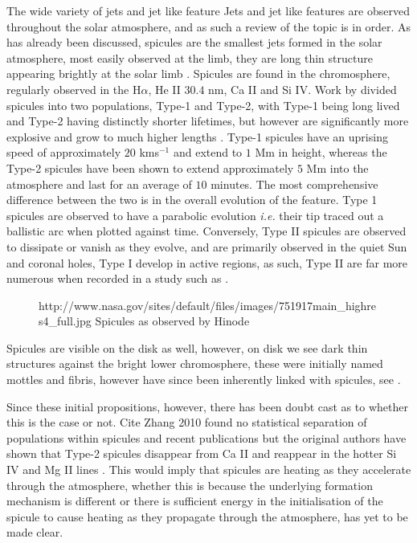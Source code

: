 The wide variety of jets and jet like feature 
Jets and jet like features are observed throughout the solar atmosphere, and as such a review of the topic is in order.
As has already been discussed, spicules are the smallest jets formed in the solar atmosphere, 
most easily observed at the limb, they are long thin structure appearing brightly at the solar limb \citep{Beckers1972}.
Spicules are found in the chromosphere, regularly observed in the H$\alpha$, He II $30.4$ nm, Ca II and Si IV.
Work by \cite{DePontieu} divided spicules into two populations, Type-1 and Type-2, with Type-1 being long lived and Type-2 having distinctly shorter lifetimes, but however are significantly more explosive and grow to much higher lengths .
Type-1 spicules have an uprising speed of approximately $20$ kms$^{-1}$ and extend to $1$ Mm in height, whereas the Type-2 spicules have been shown to extend approximately $5$ Mm into the atmosphere and last for an average of $10$ minutes.
The most comprehensive difference between the two is in the overall evolution of the feature.
Type 1 spicules are observed to have a parabolic evolution \emph{i.e.} their tip traced out a ballistic arc when plotted against time.
Conversely, Type II spicules are observed to dissipate or vanish as they evolve, and are primarily observed in the quiet Sun and coronal holes, Type I develop in active regions, as such, Type II are far more numerous when recorded in a study such as \cite{Pereira2012}.

\begin{figure}
	\caption{http://www.nasa.gov/sites/default/files/images/751917main_highres4_full.jpg Spicules as observed by Hinode}
\end{figure}

Spicules are visible on the disk as well, however, on disk we see dark thin structures against the bright lower chromosphere, these were initially named mottles and fibris, however have since been inherently linked with spicules, see \cite{DePointeu2007MF}.

Since these initial propositions, however, there has been doubt cast as to whether this is the case or not. 
Cite Zhang 2010 found no statistical separation of populations within spicules and recent publications but the original authors have shown that Type-2 spicules disappear from Ca II and reappear in the hotter Si IV and Mg II lines \citep{Pereira2014}.
This would imply that spicules are heating as they accelerate through the atmosphere, whether this is because the underlying formation mechanism is different or there is sufficient energy in the initialisation of the spicule to cause heating as they propagate through the atmosphere, has yet to be made clear.

